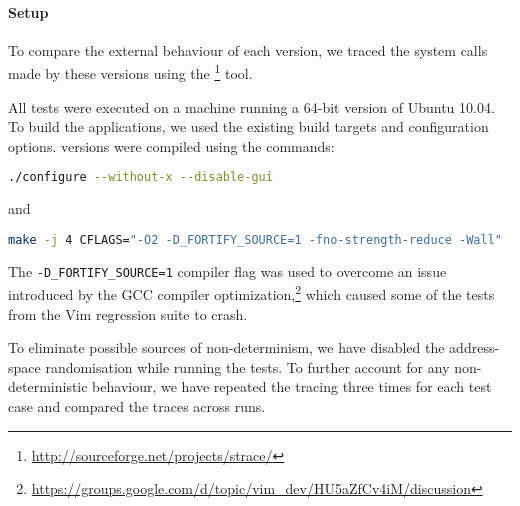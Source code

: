 
\paragraph{Setup} To compare the external behaviour of each version, we traced
the system calls made by these versions using the
\footnote{\url{http://sourceforge.net/projects/strace/}} tool.


All tests were executed on a machine running a 64-bit version of Ubuntu 10.04.
To build the applications, we used the existing build targets and configuration
options. \vim versions were compiled using the commands:
\begin{lstlisting}[language=bash,numbers=none]
./configure --without-x --disable-gui
\end{lstlisting}
and
\begin{lstlisting}[language=bash,numbers=none]
make -j 4 CFLAGS="-O2 -D_FORTIFY_SOURCE=1 -fno-strength-reduce -Wall"
\end{lstlisting}
The \texttt{-D\_FORTIFY\_SOURCE=1} compiler flag was used to overcome an issue
introduced by the GCC compiler
optimization,\footnote{\url{https://groups.google.com/d/topic/vim_dev/HU5aZfCv4iM/discussion}}
which caused some of the tests from the Vim regression suite to crash.

To eliminate possible sources of non-determinism, we have disabled the
address-space randomisation while running the tests. To further account for any
non-deterministic behaviour, we have repeated the tracing three times for each
test case and compared the traces across runs.

